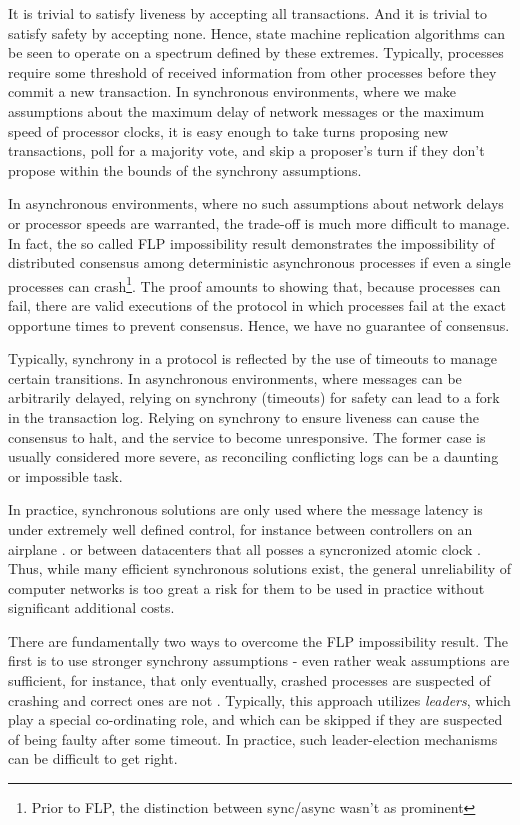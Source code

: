 It is trivial to satisfy liveness by accepting all transactions. And it is trivial to satisfy safety by accepting none.
Hence, state machine replication algorithms can be seen to operate on a spectrum defined by these extremes.
Typically, processes require some threshold of received information from other processes before they commit a new transaction.
In synchronous environments, 
where we make assumptions about the maximum delay of network messages or the maximum speed of processor clocks,
 it is easy enough to take turns proposing new transactions, poll for a majority vote, 
and skip a proposer's turn if they don't propose within the bounds of the synchrony assumptions.

In asynchronous environments, where no such assumptions about network delays or processor speeds are warranted,
the trade-off is much more difficult to manage.
In fact, the so called FLP impossibility result demonstrates the 
impossibility of distributed consensus among deterministic asynchronous processes 
if even a single processes can crash\footnote{Prior to FLP, the distinction between sync/async wasn't as prominent}\cite{flp}.
The proof amounts to showing that, because processes can fail, 
there are valid executions of the protocol in which processes fail at the exact opportune times to prevent consensus.
Hence, we have no guarantee of consensus.

Typically, synchrony in a protocol is reflected by the use of timeouts to manage certain transitions.
In asynchronous environments, where messages can be arbitrarily delayed, relying on synchrony (timeouts) for safety
can lead to a fork in the transaction log.
Relying on synchrony to ensure liveness can cause the consensus to halt, and the service to become unresponsive.
The former case is usually considered more severe, as reconciling conflicting logs can be a daunting or impossible task. 

In practice, synchronous solutions are only used where the message latency is under 
extremely well defined control, for instance between controllers on an airplane \cite{hoyme1993safebus}.
or between datacenters that all posses a syncronized atomic clock \cite{corbett2013spanner}.
Thus, while many efficient synchronous solutions exist,
the general unreliability of computer networks is too great a risk for them to be used in practice
without significant additional costs.

There are fundamentally two ways to overcome the FLP impossibility result.
The first is to use stronger synchrony assumptions - 
even rather weak assumptions are sufficient, 
for instance, that only eventually, 
crashed processes are suspected of crashing and correct ones are not \cite{chandra1996unreliable}.
Typically, this approach utilizes \emph{leaders}, 
which play a special co-ordinating role, 
and which can be skipped if they are suspected of being faulty after some timeout.
In practice, such leader-election mechanisms can be difficult to get right.

